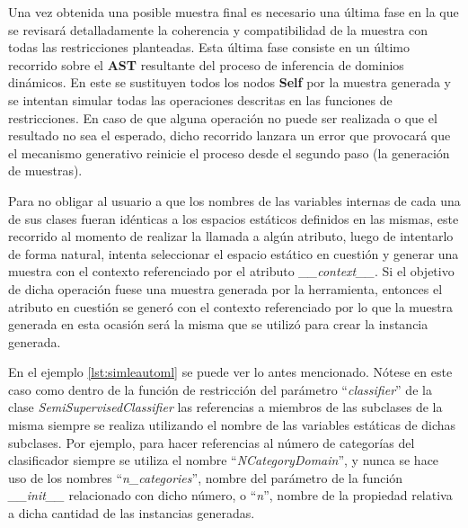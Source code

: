 Una vez obtenida una posible muestra final es necesario una última fase en la que se
revisará detalladamente la coherencia y compatibilidad de la muestra con todas las restricciones planteadas. Esta última fase consiste
en un último recorrido sobre el {\bf AST} resultante del proceso de inferencia de dominios dinámicos. En este se sustituyen todos los nodos
    {\bf Self} por la muestra generada y se intentan simular todas las operaciones descritas en las funciones de restricciones. En caso de que
alguna operación no puede ser realizada o que el resultado no sea el esperado, dicho recorrido lanzara un error que provocará que el
mecanismo generativo reinicie el proceso desde el segundo paso (la generación de muestras).

Para no obligar al usuario a que los nombres de las variables internas de cada una de sus clases fueran idénticas a los espacios
estáticos definidos en las mismas, este recorrido al momento de realizar la llamada a algún atributo, luego de intentarlo de forma
natural, intenta seleccionar el espacio estático en cuestión y generar una muestra con el contexto referenciado por el atributo
    {\it \_\_context\_\_}. Si el objetivo de dicha operación fuese una muestra generada por la herramienta, entonces el atributo en cuestión se
generó con el contexto referenciado por lo que la muestra generada en esta ocasión será la misma que se utilizó para crear la instancia
generada.

En el ejemplo \ref{lst:simleautoml} se puede ver lo antes mencionado. 
Nótese en este caso como dentro de la función de restricción del 
parámetro ``{\it classifier}'' de la clase {\it SemiSupervisedClassifier} 
las referencias a miembros de las subclases de la misma siempre se realiza 
utilizando el nombre de las variables estáticas de dichas subclases. 
Por ejemplo, para hacer referencias al número de categorías del clasificador 
siempre se utiliza el nombre ``{\it NCategoryDomain}'', y nunca se hace uso de los 
nombres ``{\it n_categories}'', nombre del parámetro de la función {\it \_\_init\_\_} 
relacionado con dicho número, o ``{\it n}'', nombre de la propiedad relativa a dicha 
cantidad de las instancias generadas.


